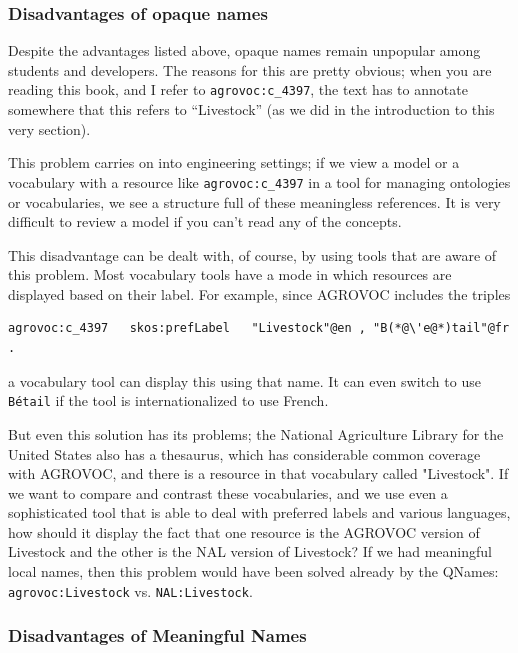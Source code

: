 \subsubsection{Disadvantages of opaque names}

Despite the advantages listed above, opaque names remain unpopular among students 
and developers.  The reasons for this are pretty obvious; when you are reading this 
book, and I refer to \texttt{agrovoc:c\_4397}, the text has to annotate somewhere that this
refers to ``Livestock'' (as we did in the introduction to this very section).   

This problem carries on into engineering settings; if we view a model or a vocabulary with 
a resource like \texttt{agrovoc:c\_4397} in a tool for managing ontologies or 
vocabularies, we see a structure full of these meaningless references.  It 
is very difficult to review a model if you can't read any of the concepts. 

This disadvantage can be dealt with, of course, by using tools that are aware of this 
problem.  Most vocabulary tools have a mode in which resources are displayed based on 
their label.  For example,  since AGROVOC includes the triples


\begin{lstlisting}
agrovoc:c_4397   skos:prefLabel   "Livestock"@en , "B(*@\'e@*)tail"@fr .
\end{lstlisting}


a vocabulary tool can display this using that name.  It can even switch to use
\texttt{B\'etail} if the tool is internationalized to use French. 

But even this solution has its problems; the National Agriculture Library for the
United States also has a thesaurus, which has considerable common coverage with 
AGROVOC, and there is a resource in that vocabulary called "Livestock".  If 
we want to compare and contrast these vocabularies, and we use even a 
sophisticated  tool that 
is able to deal with preferred labels and various languages, how should it display the
fact that one resource is the AGROVOC version of Livestock and the other is
the NAL version of Livestock?  If we had meaningful local names, then this
problem would have been solved already by the QNames:  
\texttt{agrovoc:Livestock} vs. \texttt{NAL:Livestock}.

\subsubsection{Disadvantages of Meaningful Names}


